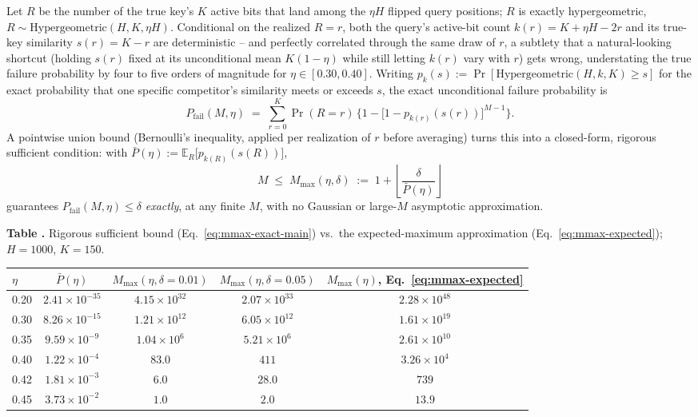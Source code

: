 \documentclass[11pt]{article}
\newcommand{\toprule}{\hline\hline}
\newcommand{\midrule}{\hline}
\newcommand{\bottomrule}{\hline\hline}
\begin{document}
Let $R$ be the number of the true key's $K$ active bits that land among the $\eta H$ flipped
query positions; $R$ is exactly hypergeometric, $R\sim\mathrm{Hypergeometric}(H,K,\eta H)$.
Conditional on the realized $R=r$, both the query's active-bit count $k(r) = K + \eta H - 2r$
and its true-key similarity $s(r) = K-r$ are deterministic -- and perfectly correlated through
the same draw of $r$, a subtlety that a natural-looking shortcut (holding $s(r)$ fixed at its
unconditional mean $K(1-\eta)$ while still letting $k(r)$ vary with $r$) gets wrong, understating
the true failure probability by four to five orders of magnitude for $\eta\in[0.30,0.40]$.
Writing $p_k(s) := \Pr[\mathrm{Hypergeometric}(H,k,K)\ge s]$ for the exact probability that one
specific competitor's similarity meets or exceeds $s$, the exact unconditional failure
probability is
\begin{equation}
P_{\mathrm{fail}}(M,\eta) \;=\; \sum_{r=0}^{K} \Pr(R=r)\,\Big\{1-\big[1-p_{k(r)}(s(r))\big]^{M-1}\Big\}.
\label{eq:pfail-exact}
\end{equation}
A pointwise union bound (Bernoulli's inequality, applied per realization of $r$ before
averaging) turns this into a closed-form, rigorous sufficient condition: with
$\bar P(\eta) := \mathbb{E}_R\big[p_{k(R)}(s(R))\big]$,
\begin{equation}
M \;\le\; M_{\max}(\eta,\delta) \;:=\; 1 + \left\lfloor \frac{\delta}{\bar P(\eta)} \right\rfloor
\label{eq:mmax-exact-main}
\end{equation}
guarantees $P_{\mathrm{fail}}(M,\eta)\le\delta$ \emph{exactly}, at any finite $M$, with no
Gaussian or large-$M$ asymptotic approximation.

\label{tab:capacity-exact}
\noindent\textbf{Table \thetable.} Rigorous sufficient bound (Eq.~\ref{eq:mmax-exact-main}) vs.\
the expected-maximum approximation (Eq.~\ref{eq:mmax-expected}); $H{=}1000$, $K{=}150$.
\begin{center}
\begin{tabular}{lcccc}
\toprule
$\eta$ & $\bar P(\eta)$ & $M_{\max}(\eta,\delta{=}0.01)$ & $M_{\max}(\eta,\delta{=}0.05)$ & $M_{\max}(\eta)$, Eq.~\ref{eq:mmax-expected} \\
\midrule
0.20 & $2.41\times10^{-35}$ & $4.15\times10^{32}$ & $2.07\times10^{33}$ & $2.28\times10^{48}$ \\
0.30 & $8.26\times10^{-15}$ & $1.21\times10^{12}$ & $6.05\times10^{12}$ & $1.61\times10^{19}$ \\
0.35 & $9.59\times10^{-9}$  & $1.04\times10^{6}$  & $5.21\times10^{6}$  & $2.61\times10^{10}$ \\
0.40 & $1.22\times10^{-4}$  & $83.0$              & $411$               & $3.26\times10^{4}$ \\
0.42 & $1.81\times10^{-3}$  & $6.0$               & $28.0$              & $739$ \\
0.45 & $3.73\times10^{-2}$  & $1.0$               & $2.0$               & $13.9$ \\
\bottomrule
\end{tabular}
\end{center}
\end{document}
